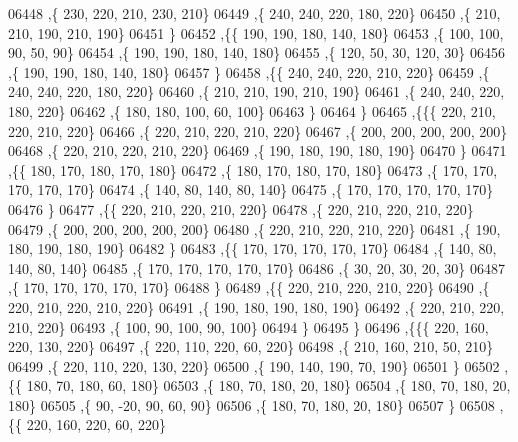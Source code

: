 \begin{DoxyCode}
06448     ,\{   230,   220,   210,   230,   210\}
06449     ,\{   240,   240,   220,   180,   220\}
06450     ,\{   210,   210,   190,   210,   190\}
06451     \}
06452    ,\{\{   190,   190,   180,   140,   180\}
06453     ,\{   100,   100,    90,    50,    90\}
06454     ,\{   190,   190,   180,   140,   180\}
06455     ,\{   120,    50,    30,   120,    30\}
06456     ,\{   190,   190,   180,   140,   180\}
06457     \}
06458    ,\{\{   240,   240,   220,   210,   220\}
06459     ,\{   240,   240,   220,   180,   220\}
06460     ,\{   210,   210,   190,   210,   190\}
06461     ,\{   240,   240,   220,   180,   220\}
06462     ,\{   180,   180,   100,    60,   100\}
06463     \}
06464    \}
06465   ,\{\{\{   220,   210,   220,   210,   220\}
06466     ,\{   220,   210,   220,   210,   220\}
06467     ,\{   200,   200,   200,   200,   200\}
06468     ,\{   220,   210,   220,   210,   220\}
06469     ,\{   190,   180,   190,   180,   190\}
06470     \}
06471    ,\{\{   180,   170,   180,   170,   180\}
06472     ,\{   180,   170,   180,   170,   180\}
06473     ,\{   170,   170,   170,   170,   170\}
06474     ,\{   140,    80,   140,    80,   140\}
06475     ,\{   170,   170,   170,   170,   170\}
06476     \}
06477    ,\{\{   220,   210,   220,   210,   220\}
06478     ,\{   220,   210,   220,   210,   220\}
06479     ,\{   200,   200,   200,   200,   200\}
06480     ,\{   220,   210,   220,   210,   220\}
06481     ,\{   190,   180,   190,   180,   190\}
06482     \}
06483    ,\{\{   170,   170,   170,   170,   170\}
06484     ,\{   140,    80,   140,    80,   140\}
06485     ,\{   170,   170,   170,   170,   170\}
06486     ,\{    30,    20,    30,    20,    30\}
06487     ,\{   170,   170,   170,   170,   170\}
06488     \}
06489    ,\{\{   220,   210,   220,   210,   220\}
06490     ,\{   220,   210,   220,   210,   220\}
06491     ,\{   190,   180,   190,   180,   190\}
06492     ,\{   220,   210,   220,   210,   220\}
06493     ,\{   100,    90,   100,    90,   100\}
06494     \}
06495    \}
06496   ,\{\{\{   220,   160,   220,   130,   220\}
06497     ,\{   220,   110,   220,    60,   220\}
06498     ,\{   210,   160,   210,    50,   210\}
06499     ,\{   220,   110,   220,   130,   220\}
06500     ,\{   190,   140,   190,    70,   190\}
06501     \}
06502    ,\{\{   180,    70,   180,    60,   180\}
06503     ,\{   180,    70,   180,    20,   180\}
06504     ,\{   180,    70,   180,    20,   180\}
06505     ,\{    90,   -20,    90,    60,    90\}
06506     ,\{   180,    70,   180,    20,   180\}
06507     \}
06508    ,\{\{   220,   160,   220,    60,   220\}

\end{DoxyCode}
